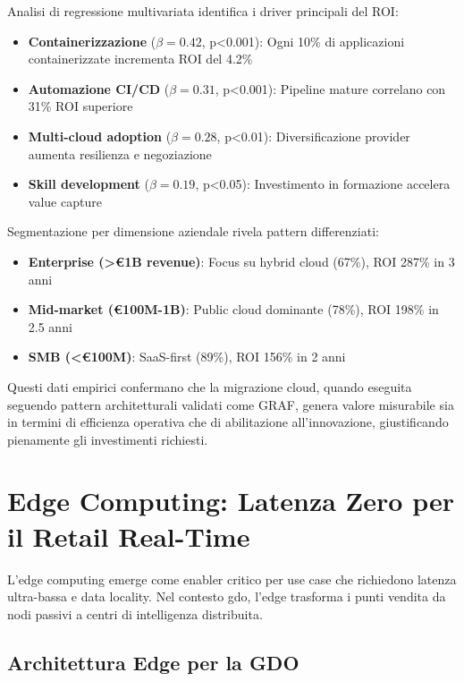 Analisi di regressione multivariata identifica i driver principali del ROI:
\begin{itemize}
\item \textbf{Containerizzazione} ($\beta = 0.42$, p<0.001): Ogni 10\% di applicazioni containerizzate incrementa ROI del 4.2\%
\item \textbf{Automazione CI/CD} ($\beta = 0.31$, p<0.001): Pipeline mature correlano con 31\% ROI superiore
\item \textbf{Multi-cloud adoption} ($\beta = 0.28$, p<0.01): Diversificazione provider aumenta resilienza e negoziazione
\item \textbf{Skill development} ($\beta = 0.19$, p<0.05): Investimento in formazione accelera value capture
\end{itemize}

Segmentazione per dimensione aziendale rivela pattern differenziati:
\begin{itemize}
\item \textbf{Enterprise (>€1B revenue)}: Focus su hybrid cloud (67\%), ROI 287\% in 3 anni
\item \textbf{Mid-market (€100M-1B)}: Public cloud dominante (78\%), ROI 198\% in 2.5 anni
\item \textbf{SMB (<€100M)}: SaaS-first (89\%), ROI 156\% in 2 anni
\end{itemize}

Questi dati empirici confermano che la migrazione cloud, quando eseguita seguendo pattern architetturali validati come GRAF, genera valore misurabile sia in termini di efficienza operativa che di abilitazione all'innovazione, giustificando pienamente gli investimenti richiesti.

\section{\texorpdfstring{Edge Computing: Latenza Zero per il Retail Real-Time}{3.4 - Edge Computing: Latenza Zero per il Retail Real-Time}}
\label{sec:edge_computing}

L'edge computing emerge come enabler critico per use case che richiedono latenza ultra-bassa e data locality. Nel contesto \gls{gdo}, l'edge trasforma i punti vendita da nodi passivi a centri di intelligenza distribuita.

\subsection{\texorpdfstring{Architettura Edge per la GDO}{3.4.1 - Architettura Edge per la GDO}}

